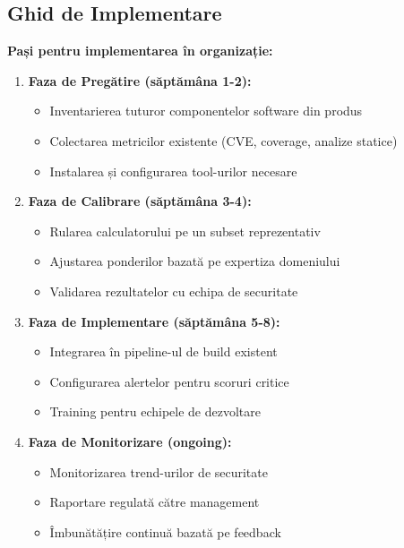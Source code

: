 \documentclass[12pt,a4paper]{article}
\begin{document}
\subsection{Ghid de Implementare}

\textbf{Pași pentru implementarea în organizație:}

\begin{enumerate}
\item \textbf{Faza de Pregătire (săptămâna 1-2):}
    \begin{itemize}
    \item Inventarierea tuturor componentelor software din produs
    \item Colectarea metricilor existente (CVE, coverage, analize statice)
    \item Instalarea și configurarea tool-urilor necesare
    \end{itemize}

\item \textbf{Faza de Calibrare (săptămâna 3-4):}
    \begin{itemize}
    \item Rularea calculatorului pe un subset reprezentativ
    \item Ajustarea ponderilor bazată pe expertiza domeniului
    \item Validarea rezultatelor cu echipa de securitate
    \end{itemize}

\item \textbf{Faza de Implementare (săptămâna 5-8):}
    \begin{itemize}
    \item Integrarea în pipeline-ul de build existent
    \item Configurarea alertelor pentru scoruri critice
    \item Training pentru echipele de dezvoltare
    \end{itemize}

\item \textbf{Faza de Monitorizare (ongoing):}
    \begin{itemize}
    \item Monitorizarea trend-urilor de securitate
    \item Raportare regulată către management
    \item Îmbunătățire continuă bazată pe feedback
    \end{itemize}
\end{enumerate}
\end{document}
